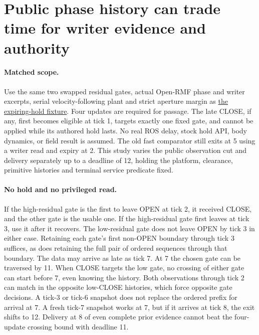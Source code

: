 \documentclass{article}
\begin{document}
\section*{Public phase history can trade time for writer evidence and authority}
\paragraph{Matched scope.}
Use the same two swapped residual gates, actual Open-RMF phase
and writer excerpts, serial velocity-following plant and strict
aperture margin as
\href{https://github.com/eternal-november/eos-research-programmes/pull/828}{the expiring-hold fixture}.
Four updates are required for passage. The late CLOSE, if any,
first becomes eligible at tick 1, targets exactly one fixed gate,
and cannot be applied while its authored hold lasts. No real
ROS delay, stock hold API, body dynamics, or field result is assumed.
The old fast comparator still exits at 5 using a writer read and
expiry at 2. This study varies the public observation cut and
delivery separately up to a deadline of 12, holding the platform,
clearance, primitive histories and terminal service predicate fixed.

\paragraph{No hold and no privileged read.}
If the high-residual gate is the first to leave OPEN at tick 2,
it received CLOSE, and the other gate is the usable one.
If the high-residual gate first leaves at tick 3, use it after
it recovers. The low-residual gate does not leave OPEN by tick 3
in either case. Retaining each gate's first non-OPEN boundary
through tick 3 suffices, as does retaining the full pair of
ordered sequences through that boundary. The data may arrive as
late as tick 7. At 7 the chosen gate can be traversed by 11.
When CLOSE targets the low gate, no crossing of either gate
can start before 7, even knowing the history. Both observations
through tick 2 can match in the opposite low-CLOSE histories,
which force opposite gate decisions. A tick-3 or tick-6 snapshot
does not replace the ordered prefix for arrival at 7. A fresh
tick-7 snapshot works at 7, but if it arrives at tick 8, the
exit shifts to 12. Delivery at 8 of even complete prior evidence
cannot beat the four-update crossing bound with deadline 11.
\end{document}
